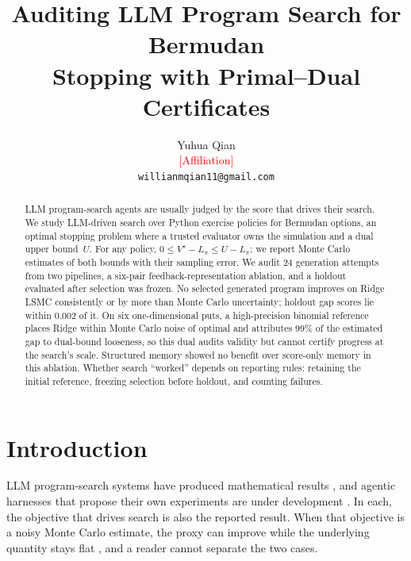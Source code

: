 \documentclass{article}
\title{Auditing LLM Program Search for Bermudan\\Stopping with Primal--Dual Certificates}
\author{%
  Yuhua Qian\\
  \textcolor{red}{[Affiliation]}\\
  \texttt{willianmqian11@gmail.com}
}
\begin{document}
\maketitle

\begin{abstract}
LLM program-search agents are usually judged by the score that drives their search.
We study LLM-driven search over Python exercise policies for Bermudan options, an optimal stopping problem where a trusted evaluator owns the simulation and a dual upper bound~$U$.
For any policy, $0 \le V^\star - L_\pi \le U - L_\pi$; we report Monte Carlo estimates of both bounds with their sampling error.
We audit 24 generation attempts from two pipelines, a six-pair feedback-representation ablation, and a holdout evaluated after selection was frozen.
No selected generated program improves on Ridge LSMC consistently or by more than Monte Carlo uncertainty; holdout gap scores lie within $0.002$ of it.
On six one-dimensional puts, a high-precision binomial reference places Ridge within Monte Carlo noise of optimal and attributes 99\% of the estimated gap to dual-bound looseness, so this dual audits validity but cannot certify progress at the search's scale.
Structured memory showed no benefit over score-only memory in this ablation.
Whether search ``worked'' depends on reporting rules: retaining the initial reference, freezing selection before holdout, and counting failures.
\end{abstract}

\section{Introduction}
\label{sec:intro}

LLM program-search systems have produced mathematical results \citep{romera2024mathematical,novikov2025alphaevolve}, and agentic harnesses that propose their own experiments are under development \citep{lehman2022elm,lu2024aiscientist,hyra2026}. In each, the objective that drives search is also the reported result. When that objective is a noisy Monte Carlo estimate, the proxy can improve while the underlying quantity stays flat \citep{manheim2018goodhart}, and a reader cannot separate the two cases.
\end{document}

